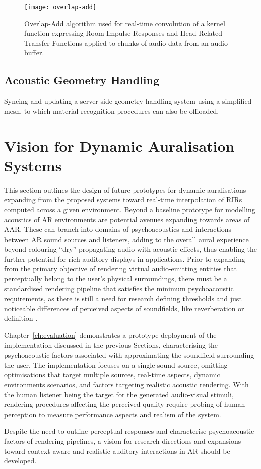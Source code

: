 \begin{figure}[htb]
    \centering
    \texttt{[image: overlap-add]}
    \caption{Overlap-Add algorithm used for real-time convolution of a kernel function expressing Room Impulse Responses and Head-Related Transfer Functions applied to chunks of audio data from an audio buffer.}
\label{fig:overlap-add}
\end{figure}

\subsection{Acoustic Geometry Handling}
Syncing and updating a server-side geometry handling system using a simplified mesh, to which material recognition procedures can also be offloaded.

\section{Vision for Dynamic Auralisation Systems}
This section outlines the design of future prototypes for dynamic auralisations expanding from the proposed systems toward real-time interpolation of RIRs computed across a given environment. 
Beyond a baseline prototype for modelling acoustics of AR environments are potential avenues expanding towards areas of AAR. These can branch into domains of psychoacoustics and interactions between AR sound sources and listeners, adding to the overall aural experience beyond colouring ``dry'' propagating audio with acoustic effects, thus enabling the further potential for rich auditory displays in applications. Prior to expanding from the primary objective of rendering virtual audio-emitting entities that perceptually belong to the user's physical surroundings, there must be a standardised rendering pipeline that satisfies the minimum psychoacoustic requirements, as there is still a need for research defining thresholds and just noticeable differences of perceived aspects of soundfields, like reverberation or definition \citep{yang2022audio}.\par
Chapter~\ref{ch:evaluation} demonstrates a prototype deployment of the implementation discussed in the previous Sections, characterising the psychoacoustic factors associated with approximating the soundfield surrounding the user. The implementation focuses on a single sound source, omitting optimisations that target multiple sources, real-time aspects, dynamic environments scenarios, and factors targeting realistic acoustic rendering. With the human listener being the target for the generated audio-visual stimuli, rendering procedures affecting the perceived quality require probing of human perception to measure performance aspects and realism of the system. \par
Despite the need to outline perceptual responses and characterise psychoacoustic factors of rendering pipelines, a vision for research directions and expansions toward context-aware and realistic auditory interactions in AR should be developed.

